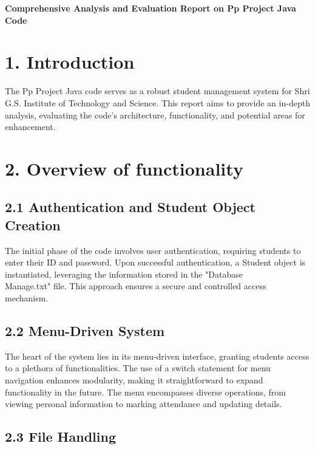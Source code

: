 \documentclass{article}
\begin{document}
\begin{center}
    \textbf{\huge{Comprehensive Analysis and Evaluation Report on Pp Project Java Code}}
\end{center}

\section*{\textbf\textbf{{1. Introduction}}}

The Pp Project Java code serves as a robust student management system for Shri G.S. Institute of Technology and Science. 
This report aims to provide an in-depth analysis, evaluating the code's architecture, functionality, and potential areas for enhancement.

\section*{\textbf\textbf{{2. Overview of functionality}}}

\subsection*{\textbf{2.1 Authentication and Student Object Creation}}

The initial phase of the code involves user authentication, requiring students to enter their ID and password. Upon successful authentication, 
a Student object is instantiated, leveraging the information stored in the "Database\\Manage.txt" file. 
This approach ensures a secure and controlled access mechanism.

\subsection*{\textbf{2.2 Menu-Driven System}}

The heart of the system lies in its menu-driven interface, granting students access to a plethora of functionalities. 
The use of a switch statement for menu navigation enhances modularity, making it straightforward to expand functionality in the future. 
The menu encompasses diverse operations, from viewing personal information to marking attendance and updating details.

\subsection*{\textbf{2.3 File Handling}}
\end{document}
